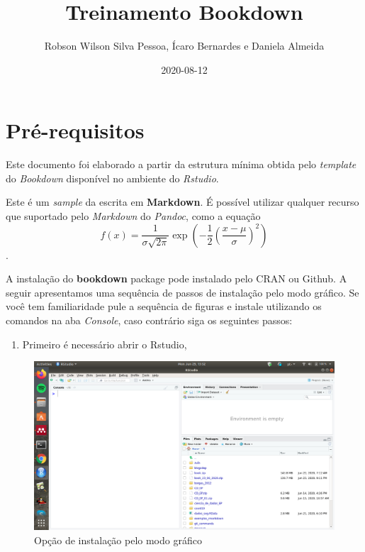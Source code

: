 \documentclass[
]{book}
\title{Treinamento Bookdown}
\author{Robson Wilson Silva Pessoa, Ícaro Bernardes e Daniela Almeida}
\date{2020-08-12}
\newenvironment{Shaded}{\begin{snugshade}}{\end{snugshade}}
\newcommand{\DataTypeTok}[1]{\textcolor[rgb]{0.13,0.29,0.53}{#1}}
\newcommand{\KeywordTok}[1]{\textcolor[rgb]{0.13,0.29,0.53}{\textbf{#1}}}
\newcommand{\NormalTok}[1]{#1}
\newcommand{\OperatorTok}[1]{\textcolor[rgb]{0.81,0.36,0.00}{\textbf{#1}}}
\newcommand{\OtherTok}[1]{\textcolor[rgb]{0.56,0.35,0.01}{#1}}
\providecommand{\tightlist}{%
  \setlength{\itemsep}{0pt}\setlength{\parskip}{0pt}}
\begin{document}
\maketitle

{
\setcounter{tocdepth}{1}
\tableofcontents
}
\begin{Shaded}
\end{Shaded}

\hypertarget{pruxe9-requisitos}{%
\chapter{Pré-requisitos}\label{pruxe9-requisitos}}

Este documento foi elaborado a partir da estrutura mínima
obtida pelo \emph{template} do \emph{Bookdown} disponível no ambiente
do \emph{Rstudio}.

Este é um \emph{sample} da escrita em \textbf{Markdown}. É
possível utilizar qualquer recurso que suportado
pelo \emph{Markdown} do \emph{Pandoc}, como a
equação
\[f(x) = \frac{1}{\sigma\sqrt{2\pi}}\exp\left(-\frac{1}{2}\left(\frac{x-\mu}{\sigma}\right)^2\right)\].

A instalação do \textbf{bookdown} package pode instalado pelo CRAN ou Github. A seguir apresentamos uma sequência
de passos de instalação pelo modo gráfico. Se
você tem familiaridade pule a sequência de
figuras e instale utilizando os comandos na aba
\emph{Console}, caso contrário siga os seguintes passos:

\begin{enumerate}
\def\labelenumi{\arabic{enumi}.}
\tightlist
\item
  Primeiro é necessário abrir o Rstudio,
\end{enumerate}

\begin{figure}
\centering
\includegraphics{fig/open_Rstudio.png}
\caption{Opção de instalação pelo modo gráfico}
\end{figure}
\end{document}
